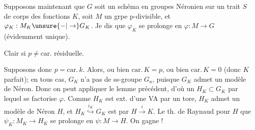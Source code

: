 
Supposons maintenant que $G$ soit un schéma en
groupes Néronien sur un trait $S$ de corps des
fonctions $K$, soit $M$ un grpe p-divisible, et
$\varphi_K:M_K\unsure{-|\to}G_K$. Je dis que $\varphi_K$ se prolonge en
$\varphi:M\to G$ (évidemment unique).

Clair si $p\ne\mathrm{car}.$ résiduelle.

Supposons donc $p=\mathrm{car}.\,k$. Alors, ou bien $\mathrm{car}.\,K=p$,
ou bien $\mathrm{car}.\,K=0$ (donc $K$ parfait); en tous cas,
$G_K$ n'a pas de ss-groupe  $G_a$, puisque
$G_K$ admet un modèle de Néron. Donc on
peut appliquer le lemme précédent,  d'où
un $H_K\subset G_K$ par lequel se factorise $\varphi$.
Comme $H_K$ est ext. d'une VA par un tore,
$H_K$ admet un modèle de Néron $H$, et $H_K\overset{i_K}{\hookrightarrow}G_K$
est  par $H\xrightarrow{i}K$. Le th. de Raynaud
pour $H$  que $\psi_K:M_K\to H_K$ se
prolonge en $\psi:M\longrightarrow H$. On gagne !
